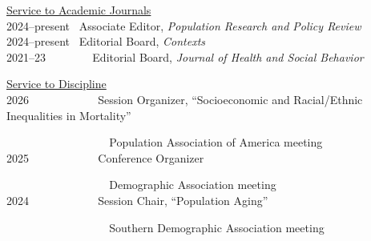 \documentclass[11pt,]{article}
\begin{document}
\underline{Service to Academic Journals}\\
2024--present ~Associate Editor, \emph{Population Research and Policy
Review}\\
2024--present ~Editorial Board, \emph{Contexts}\\
2021--23 ~ ~ ~ ~ ~Editorial Board, \emph{Journal of Health and Social
Behavior}

\underline{Service to Discipline}\\
2026 ~ ~ ~ ~ ~ ~ ~ Session Organizer, ``Socioeconomic and Racial/Ethnic
Inequalities in Mortality''\\
\strut ~ ~ ~ ~ ~ ~ ~ ~ ~ ~ ~ Population Association of America meeting\\
2025 ~ ~ ~ ~ ~ ~ ~ Conference Organizer\\
\strut ~ ~ ~ ~ ~ ~ ~ ~ ~ ~ ~ Demographic Association meeting\\
2024 ~ ~ ~ ~ ~ ~ ~ Session Chair, ``Population Aging''\\
\strut ~ ~ ~ ~ ~ ~ ~ ~ ~ ~ ~ Southern Demographic Association meeting
\end{document}
